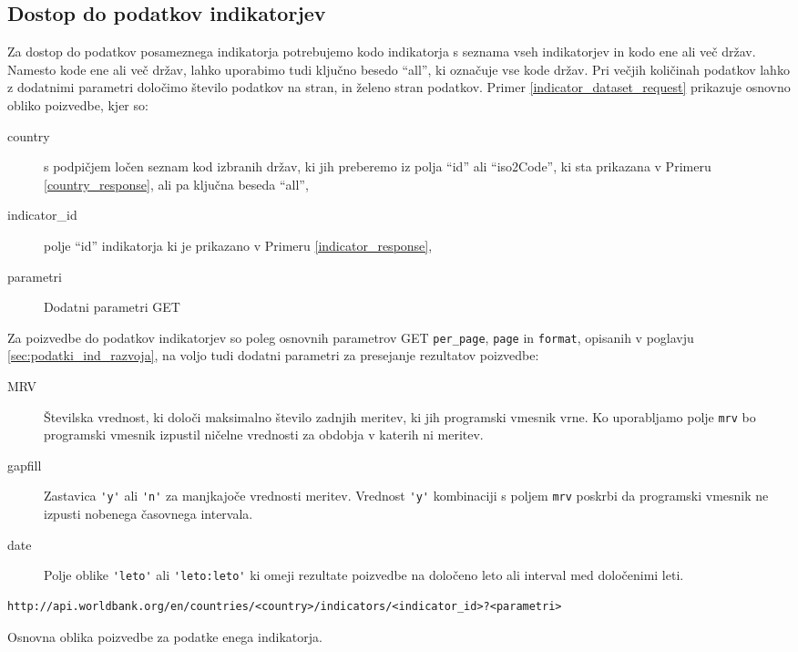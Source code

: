 \subsection{Dostop do podatkov indikatorjev}

Za dostop do podatkov posameznega indikatorja potrebujemo kodo
indikatorja s seznama vseh indikatorjev in kodo ene ali več držav. Namesto
kode ene ali več držav, lahko uporabimo tudi ključno besedo ``all'', ki
označuje vse kode držav. Pri večjih količinah podatkov lahko z dodatnimi
parametri določimo število podatkov na stran, in želeno stran podatkov.
Primer \ref{indicator_dataset_request} prikazuje osnovno obliko poizvedbe,
kjer so:
\begin{description}
\item [country] s podpičjem ločen seznam kod izbranih držav, ki jih 
	  preberemo iz polja ``id'' ali ``iso2Code'', ki sta prikazana v Primeru 
    \ref{country_response}, ali pa ključna beseda ``all'',
\item [indicator\_id] polje ``id'' indikatorja ki je prikazano v Primeru 
    \ref{indicator_response},
\item [parametri] Dodatni parametri GET 
\end{description}
Za poizvedbe do podatkov indikatorjev so poleg osnovnih parametrov GET 
\verb|per_page|, \verb|page| in \verb|format|, opisanih v poglavju 
\ref{sec:podatki_ind_razvoja}, na voljo tudi dodatni parametri za presejanje
rezultatov poizvedbe:
\begin{description}  
\item [MRV] Številska vrednost, ki določi maksimalno število zadnjih meritev,
    ki jih programski vmesnik vrne. Ko uporabljamo polje \verb|mrv| bo 
    programski vmesnik izpustil ničelne vrednosti za obdobja v katerih ni
    meritev.
\item [gapfill] Zastavica \verb|'y'| ali \verb|'n'| za manjkajoče vrednosti meritev.
    Vrednost \verb|'y'| kombinaciji s poljem \verb|mrv| poskrbi da programski 
    vmesnik ne izpusti nobenega časovnega intervala.
\item [date] Polje oblike \verb|'leto'| ali \verb|'leto:leto'| ki omeji rezultate poizvedbe
    na določeno leto ali interval med določenimi leti. 
\end{description}


\begin{snippet}
\begin{center}
\begin{lstlisting}
http://api.worldbank.org/en/countries/<country>/indicators/<indicator_id>?<parametri>
\end{lstlisting}
\end{center}
\caption{Osnovna oblika poizvedbe za podatke enega indikatorja.}
\label{indicator_dataset_request}
\end{snippet} 

